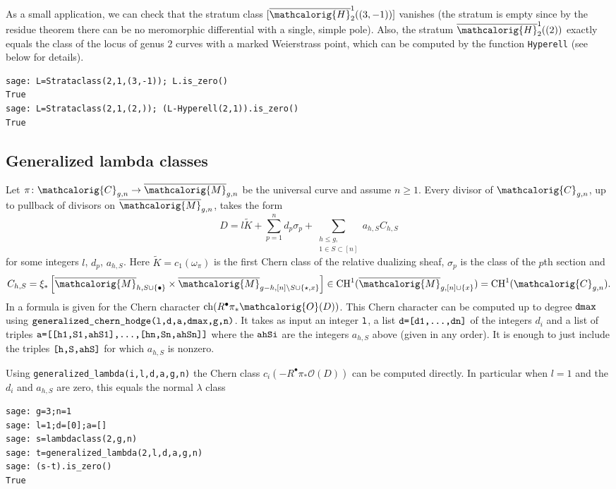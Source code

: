 \documentclass[11pt]{article}
\newcommand{\M}{\ensuremath{\overline{\mathcalorig{M}}}}
\begin{document}
As a small application, we can check that the stratum class $[\overline{\mathcalorig{H}}_2^1((3,-1))]$ vanishes (the stratum is empty since by the residue theorem there can be no meromorphic differential with a single, simple pole). Also, the stratum $\overline{\mathcalorig{H}}_2^1((2))$ exactly equals the class of the locus of genus $2$ curves with a marked Weierstrass point, which can be computed by the function \texttt{Hyperell} (see below for details).
\begin{lstlisting}
sage: L=Strataclass(2,1,(3,-1)); L.is_zero()
True
sage: L=Strataclass(2,1,(2,)); (L-Hyperell(2,1)).is_zero()
True
\end{lstlisting}



\subsection{Generalized lambda classes}
Let $\pi \colon \mathcalorig{C}_{g,n}\to \M_{g,n}$ be the universal curve and assume $n\geq 1$. Every divisor of $\mathcalorig{C}_{g,n}$, up to pullback of divisors on $\M_{g,n}$, takes the form
\[
D= l\tilde{K} + \sum^n_{p=1}d_p\sigma_p + \sum_{\substack{h\leq g,\\ 1\in S\subset [n]}}a_{h,S} C_{h,S}
\]
for some integers $l$, $d_p$, $a_{h,S}$. Here $\tilde{K}=c_1(\omega_\pi)$ is the first Chern class of the relative dualizing sheaf,  $\sigma_p$ is the class of the $p$th section and
\[
C_{h,S} = \xi_* \left[\M_{h,S\cup\{\bullet\}} \times \M_{g-h,[n]\backslash S \cup \{\star,x\}}\right]\in \mathrm{CH}^1(\M_{g,[n]\cup\{x\}})=\mathrm{CH}^1(\mathcalorig{C}_{g,n}).
\]
In \cite{PRvZ} a formula is given for the Chern character $\operatorname{ch}(R^\bullet\pi_*\mathcalorig{O} (D))$. This Chern character can be computed up to degree $\verb|dmax|$ using  $\verb|generalized_chern_hodge(l,d,a,dmax,g,n)|$. It takes as input an integer $\verb|l|$, a list $\verb|d=[d1,...,dn]|$ of the integers $d_i$ and a list of triples $\verb|a=[[h1,S1,ahS1],...,[hn,Sn,ahSn]]|$ where the $\verb|ahSi|$ are the integers $a_{h,S}$ above (given in any order). It is enough to just include the triples $\verb|[h,S,ahS]|$ for which $a_{h,S}$ is nonzero.


Using \verb|generalized_lambda(i,l,d,a,g,n)| the Chern class $c_i(-R^\bullet \pi_* \mathcal{O}(D))$ can be computed directly. In particular when $l=1$ and the $d_i$ and  $a_{h,S}$ are zero, this equals the normal $\lambda$ class
\begin{lstlisting}
sage: g=3;n=1
sage: l=1;d=[0];a=[]
sage: s=lambdaclass(2,g,n)
sage: t=generalized_lambda(2,l,d,a,g,n)
sage: (s-t).is_zero()
True
\end{lstlisting}
\end{document}
